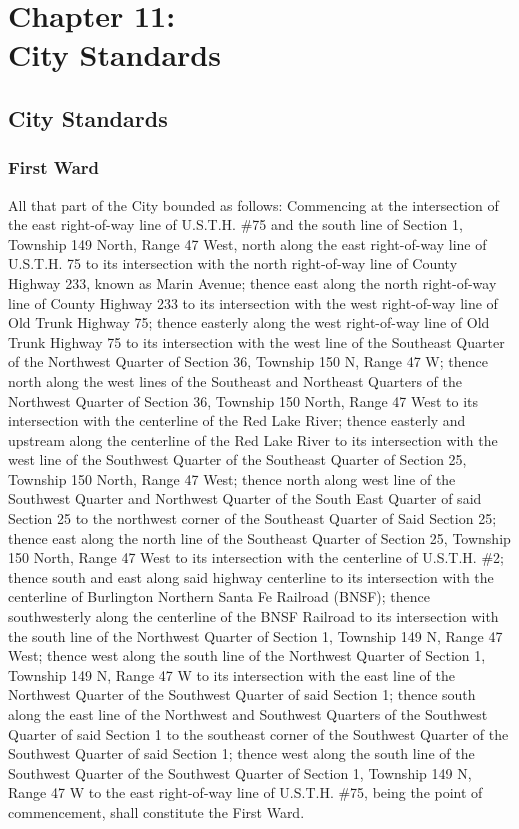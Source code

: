 \chapter*{Chapter 11: \\
	City Standards}
    \minitoc
    \pagebreak
    
\section{City Standards}
\subsection{First Ward}
All that part of the City bounded as follows:  Commencing at the intersection of the east right-of-way line of U.S.T.H. \#75 and the south line of Section 1, Township 149 North, Range 47 West, north along the east right-of-way line of U.S.T.H. 75 to its intersection with the north right-of-way line of County Highway 233, known as Marin Avenue; thence east along the north right-of-way line of County Highway 233 to its intersection with the west right-of-way line of Old Trunk Highway 75; thence easterly along the west right-of-way line of Old Trunk Highway 75 to its intersection with the west line of the Southeast Quarter of the Northwest Quarter of Section 36, Township 150 N, Range 47 W; thence north along the west lines of the Southeast and Northeast Quarters of the Northwest Quarter of Section 36, Township 150 North, Range 47 West to its intersection with the centerline of the Red Lake River; thence easterly and  upstream along the centerline of the Red Lake River to its intersection with the west line of the Southwest Quarter of the Southeast Quarter  of Section 25, Township 150 North, Range 47 West; thence north along west line of the Southwest Quarter and Northwest Quarter of the South East Quarter of said Section 25 to the northwest corner of the Southeast Quarter of Said Section 25; thence east along the north line of the Southeast Quarter of Section 25, Township 150 North, Range 47 West to its intersection with the centerline of U.S.T.H. \#2; thence south and east along said highway centerline to its intersection with the centerline of Burlington Northern Santa Fe Railroad (BNSF); thence southwesterly along the centerline of the BNSF Railroad to its intersection with the south line of the Northwest Quarter of Section 1, Township 149 N, Range 47 West; thence west along the south line of the Northwest Quarter of Section 1, Township 149 N, Range 47 W to its intersection with the east line of the Northwest Quarter of the Southwest Quarter of  said Section 1; thence south along the east line of the Northwest and Southwest Quarters of the Southwest Quarter of said Section 1 to the southeast corner of the Southwest Quarter of the Southwest Quarter of  said Section 1; thence west along the south line of the Southwest Quarter of the Southwest Quarter of Section 1, Township 149 N, Range 47 W to the east right-of-way line of U.S.T.H. \#75, being the point of commencement, shall constitute the First Ward.


